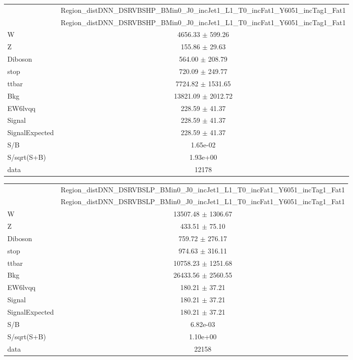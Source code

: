 \documentclass{article}
\begin{document}
\begin{table}
\centering
\small
\begin{tabular}{l|c|}
\cline{2-2}
 & \multicolumn{1}{c|}{Region\_distDNN\_DSRVBSHP\_BMin0\_J0\_incJet1\_L1\_T0\_incFat1\_Y6051\_incTag1\_Fat1}\\
\cline{2-2}
 & \multicolumn{1}{c|}{Region\_distDNN\_DSRVBSHP\_BMin0\_J0\_incJet1\_L1\_T0\_incFat1\_Y6051\_incTag1\_Fat1}\\ \hline
W & 4656.33 $\pm$ 599.26\\
Z & 155.86 $\pm$ 29.63\\
Diboson & 564.00 $\pm$ 208.79\\
stop & 720.09 $\pm$ 249.77\\
ttbar & 7724.82 $\pm$ 1531.65\\
\hline
Bkg & 13821.09 $\pm$ 2012.72\\
\hline
EW6lvqq & 228.59 $\pm$ 41.37\\
\hline
Signal & 228.59 $\pm$ 41.37\\
SignalExpected & 228.59 $\pm$ 41.37\\
\hline
S/B & 1.65e-02\\
S/sqrt(S+B) & 1.93e+00\\
\hline
data & 12178\\ \hline
\end{tabular}
\end{table}


\begin{table}
\centering
\small
\begin{tabular}{l|c|}
\cline{2-2}
 & \multicolumn{1}{c|}{Region\_distDNN\_DSRVBSLP\_BMin0\_J0\_incJet1\_L1\_T0\_incFat1\_Y6051\_incTag1\_Fat1}\\
\cline{2-2}
 & \multicolumn{1}{c|}{Region\_distDNN\_DSRVBSLP\_BMin0\_J0\_incJet1\_L1\_T0\_incFat1\_Y6051\_incTag1\_Fat1}\\ \hline
W & 13507.48 $\pm$ 1306.67\\
Z & 433.51 $\pm$ 75.10\\
Diboson & 759.72 $\pm$ 276.17\\
stop & 974.63 $\pm$ 316.11\\
ttbar & 10758.23 $\pm$ 1251.68\\
\hline
Bkg & 26433.56 $\pm$ 2560.55\\
\hline
EW6lvqq & 180.21 $\pm$ 37.21\\
\hline
Signal & 180.21 $\pm$ 37.21\\
SignalExpected & 180.21 $\pm$ 37.21\\
\hline
S/B & 6.82e-03\\
S/sqrt(S+B) & 1.10e+00\\
\hline
data & 22158\\ \hline
\end{tabular}
\end{table}
\end{document}
